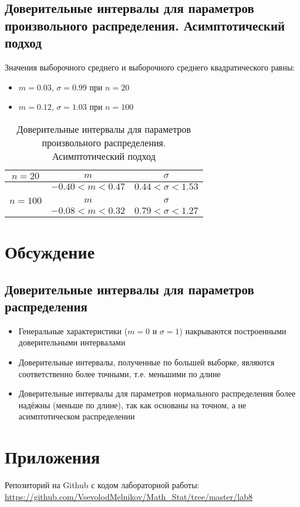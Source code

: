 \subsection{Доверительные интервалы для параметров произвольного распределения. Асимптотический подход}
Значения выборочного среднего и выборочного среднего квадратического равны:
\begin{itemize}
	\item $m=0.03$, $\sigma=0.99$ при $n=20$
	\item $m=0.12$, $\sigma=1.03$ при $n=100$
\end{itemize}
\begin{table}[!ht]
	\centering
		\begin{tabular} {|c|c|c|}
			\hline
			$n=20$ & $m$ & $\sigma$ \\ \hline
			 & $-0.40<m<0.47$ & $0.44<\sigma<1.53$ \\ \hline
			 & & \\ \hline
			$n=100$ & $m$ & $\sigma$ \\ \hline
			 & $-0.08<m<0.32$ & $0.79<\sigma<1.27$ \\ \hline
		\end{tabular}
		\caption{Доверительные интервалы для параметров произвольного распределения. Асимптотический подход}
\end{table}

\section{Обсуждение}
\subsection{Доверительные интервалы для параметров распределения}
\begin{itemize}
	\item Генеральные характеристики ($m=0$ и $\sigma=1$) накрываются построенными доверительными интервалами
	\item Доверительные интервалы, полученные по большей выборке, являются соответственно более точными, т.е. меньшими по длине
	\item Доверительные интервалы для параметров нормального распределения более надёжны (меньше по длине), так как основаны на точном, а не асимптотическом распределении
\end{itemize}

\section{Приложения}
Репозиторий на Github с кодом лабораторной работы:\\
\url{https://github.com/VsevolodMelnikov/Math_Stat/tree/master/lab8}


